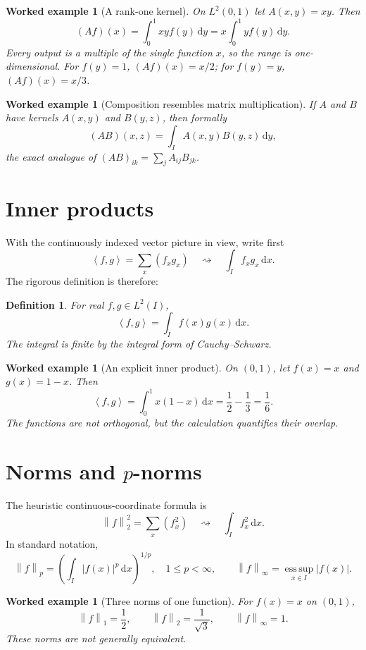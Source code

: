 \documentclass[11pt,a5paper,oneside,openany]{scrreprt}
\theoremstyle{notes}
\theoremstyle{definitions}
\newtheorem{definition}[theorem]{Definition}
\newtheorem{example}[theorem]{Worked example}
\newcommand{\ip}[2]{\left\langle #1,#2\right\rangle}
\newcommand{\norm}[1]{\left\lVert #1\right\rVert}
\newcommand{\dd}{\,\mathrm{d}}
\begin{document}
\begin{example}[A rank-one kernel]
On $L^2(0,1)$ let $A(x,y)=xy$.  Then
\[
 (Af)(x)=\int_0^1xyf(y)\dd y
 =x\int_0^1yf(y)\dd y.
\]
Every output is a multiple of the single function $x$, so the range is
one-dimensional.  For $f(y)=1$, $(Af)(x)=x/2$; for $f(y)=y$,
$(Af)(x)=x/3$.
\end{example}

\begin{example}[Composition resembles matrix multiplication]
If $A$ and $B$ have kernels $A(x,y)$ and $B(y,z)$, then formally
\[
 (AB)(x,z)=\int_I A(x,y)B(y,z)\dd y,
\]
the exact analogue of $(AB)_{ik}=\sum_jA_{ij}B_{jk}$.
\end{example}

\section{Inner products}

With the continuously indexed vector picture in view, write first
\[
 \ip{f}{g}=\sum_x(f_xg_x)
 \quad\rightsquigarrow\quad
 \int_I f_xg_x\dd x.
\]
The rigorous definition is therefore:

\begin{definition}
For real $f,g\in L^2(I)$,
\[
  \boxed{\ip{f}{g}=\int_I f(x)g(x)\dd x}.
\]
The integral is finite by the integral form of Cauchy--Schwarz.
\end{definition}

\begin{example}[An explicit inner product]
On $(0,1)$, let $f(x)=x$ and $g(x)=1-x$.  Then
\[
 \ip{f}{g}=\int_0^1x(1-x)\dd x
 =\frac12-\frac13=\frac16.
\]
The functions are not orthogonal, but the calculation quantifies their
overlap.
\end{example}

\section{Norms and $p$-norms}

The heuristic continuous-coordinate formula is
\[
 \norm{f}_2^2=\sum_x(f_x^2)
 \quad\rightsquigarrow\quad
 \int_I f_x^2\dd x.
\]
In standard notation,
\[
 \boxed{\norm{f}_p=\left(\int_I|f(x)|^p\dd x\right)^{1/p}},
 \quad 1\le p<\infty,
 \qquad
 \norm{f}_\infty=\operatorname*{ess\,sup}_{x\in I}|f(x)|.
\]

\begin{example}[Three norms of one function]
For $f(x)=x$ on $(0,1)$,
\[
 \norm{f}_1=\frac12,
 \qquad
 \norm{f}_2=\frac1{\sqrt3},
 \qquad
 \norm{f}_\infty=1.
\]
These norms are not generally equivalent.
\end{example}
\end{document}

